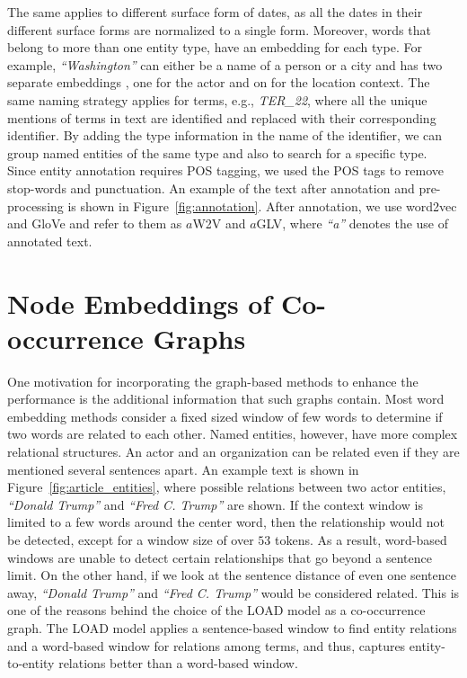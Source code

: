 The same applies to different surface form of dates, as all the dates in their different surface forms  are normalized to a single form. Moreover, words that belong to more than one entity type, have an embedding for each type. For example, \emph{``Washington''} can either be a name of a person or a city and has two separate embeddings , one for the actor and on for the location context. The same naming strategy applies for terms, e.g., \emph{TER\_22}, where all the unique mentions of terms in text are identified and replaced with their corresponding identifier. By adding the type information in the name of the identifier, we can group named entities of the same type and also to search for a specific type. \\
Since entity annotation requires POS tagging, we used the POS tags to remove stop-words and punctuation. An example of the text after annotation and pre-processing is shown in Figure~\ref{fig:annotation}. After annotation, we use word2vec and GloVe and refer to them as $a$W2V and $a$GLV, where \emph{``a''} denotes the use of annotated text. 

\section{Node Embeddings of Co-occurrence Graphs}\label{sec:graph_based}

One motivation for incorporating the graph-based methods to enhance the performance is the additional information that such graphs contain. Most word embedding methods consider a fixed sized window of few words to determine if two words are related to each other. Named entities, however, have more complex relational structures. An actor and an organization can be related even if they are mentioned several sentences apart. An example text is shown in Figure~\ref{fig:article_entities}, where possible relations between two actor entities, \emph{``Donald Trump''} and \emph{``Fred C. Trump''} are shown. If the context window is limited to a few words around the center word, then the relationship would not be detected, except for a window size of over $53$ tokens. As a result, word-based windows are unable to detect certain relationships that go beyond a sentence limit. 
On the other hand, if we look at the sentence distance of even one sentence away, \emph{``Donald Trump''} and \emph{``Fred C. Trump''} would be considered related. This is one of the reasons behind the choice of the LOAD model as a co-occurrence graph. The LOAD model applies a sentence-based window to find entity relations and a word-based window for relations among terms, and thus, captures entity-to-entity relations better than a word-based window.

